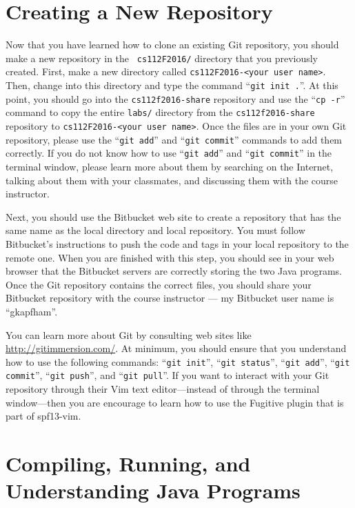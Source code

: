 \vspace*{-.1in}

\section*{Creating a New Repository}

Now that you have learned how to clone an existing Git repository, you should make a new repository in the {\tt
  cs112F2016/} directory that you previously created.  First, make a new directory called {\tt cs112F2016-<your user
  name>}. Then, change into this directory and type the command ``{\tt git init .}''.  At this point, you should go into
the {\tt cs112f2016-share} repository and use the ``{\tt cp -r}'' command to copy the entire {\tt labs/} directory from
the {\tt cs112f2016-share} repository to {\tt cs112F2016-<your user name>}.  Once the files are in your own Git
repository, please use the ``{\tt git add}'' and ``{\tt git commit}'' commands to add them correctly. If you do not know
how to use ``{\tt git add}'' and ``{\tt git commit}'' in the terminal window, please learn more about them by searching
on the Internet, talking about them with your classmates, and discussing them with the course instructor.

Next, you should use the Bitbucket web site to create a repository that has the same name as the local directory and
local repository.  You must follow Bitbucket's instructions to push the code and tags in your local repository to the
remote one. When you are finished with this step, you should see in your web browser that the Bitbucket servers are
correctly storing the two Java programs. Once the Git repository contains the correct files, you should share your Bitbucket
repository with the course instructor --- my Bitbucket user name is ``gkapfham''.

You can learn more about Git by consulting web sites like  \url{http://gitimmersion.com/}.  At minimum, you should
ensure that you understand how to use the following commands: ``{\tt git init}'', ``{\tt git status}'', ``{\tt git
  add}'', ``{\tt git commit}'', ``{\tt git push}'', and ``{\tt git pull}''. If you want to interact with your Git
repository through their Vim text editor---instead of through the terminal window---then you are encourage to learn how
to use the Fugitive plugin that is part of spf13-vim.

\section*{Compiling, Running, and Understanding Java Programs}

